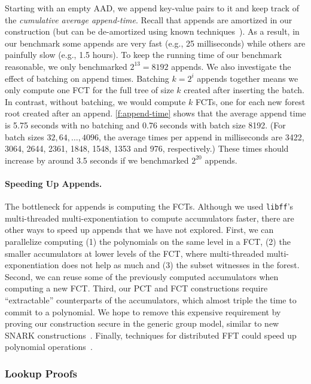 Starting with an empty AAD, we append key-value pairs to it and keep track of the \textit{cumulative average append-time}.
Recall that appends are amortized in our construction (but can be de-amortized using known techniques~\cite{overmars-van-leeuwen,overmars}).
As a result, in our benchmark some appends are very fast (e.g., 25 milliseconds) while others are painfully slow (e.g., 1.5 hours).
To keep the running time of our benchmark reasonable, we only benchmarked $2^{13} = 8192$ appends.
We also investigate the effect of batching on append times.
Batching $k = 2^i$ appends together means we only compute one FCT for the full tree of size $k$ created after inserting the batch.
In contrast, without batching, we would compute $k$ FCTs, one for each new forest root created after an append.
\cref{f:append-time} shows that the average append time is 5.75 seconds with no batching and 0.76 seconds with batch size 8192.
(For batch sizes $32, 64, \dots, 4096$, the average times per append in milliseconds are 3422, 3064, 2644, 2361, 1848, 1548, 1353 and 976, respectively.)
These times should increase by around 3.5 seconds if we benchmarked $2^{20}$ appends.

\paragraph{Speeding Up Appends.}
The bottleneck for appends is computing the FCTs.
Although we used \texttt{libff}'s multi-threaded multi-exponentiation to compute accumulators faster, there are other ways to speed up appends that we have not explored.
First, we can parallelize computing (1) the polynomials on the same level in a FCT, (2) the smaller accumulators at lower levels of the FCT, where multi-threaded multi-exponentiation does not help as much and (3) the subset witnesses in the forest.
Second, we can reuse some of the previously computed accumulators when computing a new FCT.
Third, our PCT and FCT constructions require ``extractable'' counterparts of the accumulators, which almost triple the time to commit to a polynomial.
We hope to remove this expensive requirement by proving our construction secure in the generic group model, similar to new SNARK constructions~\cite{groth16}.
Finally, techniques for distributed FFT could speed up polynomial operations~\cite{dizk}.

\subsubsection{Lookup Proofs}
\label{s:eval:lookup}

